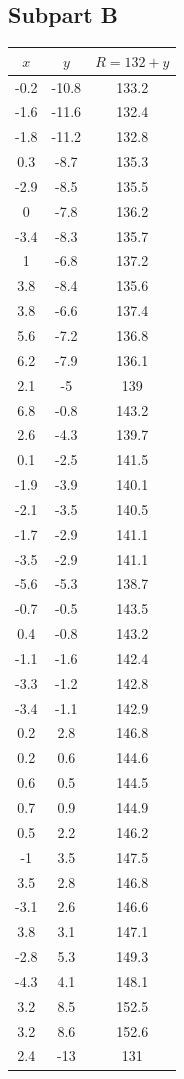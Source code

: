 \documentclass[8pt]{extarticle}
\begin{document}
{\subsection*{Subpart B}
\begin{center}
	\begin{tabular}{c|c|c}
		$x$ & $y$ & $R = 132 + y$ \\
		\hline
		-0.2 &	-10.8 &	133.2 \\
		-1.6 &	-11.6 &	132.4 \\
		-1.8 &	-11.2 &	132.8 \\
		0.3 &	-8.7 &	135.3 \\
		-2.9 &	-8.5 &	135.5 \\
		0 & 	-7.8 &	136.2 \\
		-3.4 &	-8.3 &	135.7 \\
		1 & 	-6.8 & 	137.2 \\
		3.8 &	-8.4 &	135.6 \\
		3.8 &	-6.6 &	137.4 \\
		5.6 &	-7.2 &	136.8 \\
		6.2 &	-7.9 &	136.1 \\
		2.1 &	-5 &	139 \\
		6.8 &	-0.8 &	143.2 \\
		2.6 &	-4.3 &	139.7 \\
		0.1 &	-2.5 &	141.5 \\
		-1.9 &	-3.9 &	140.1 \\
		-2.1 &	-3.5 &	140.5 \\
		-1.7 &	-2.9 &	141.1 \\
		-3.5 &	-2.9 &	141.1 \\
		-5.6 &	-5.3 &	138.7 \\
		-0.7 &	-0.5 &	143.5 \\
		0.4 &	-0.8 &	143.2 \\
		-1.1 &	-1.6 &	142.4 \\
		-3.3 &	-1.2 &	142.8 \\
		-3.4 &	-1.1 &	142.9 \\
		0.2 &	2.8 &	146.8 \\
		0.2 &	0.6 &	144.6 \\
		0.6 &	0.5 &	144.5 \\
		0.7 &	0.9 &	144.9 \\
		0.5 &	2.2 &	146.2 \\
		-1 &	3.5 &	147.5 \\
		3.5 &	2.8 &	146.8 \\
		-3.1 &	2.6 &	146.6 \\
		3.8 &	3.1 &	147.1 \\
		-2.8 &	5.3 &	149.3 \\
		-4.3 &	4.1 &	148.1 \\
		3.2 &	8.5 &	152.5 \\
		3.2 &	8.6 &	152.6 \\
		2.4 &	-13 &	131 \\
	\end{tabular}
\end{center}
}
\end{document}
